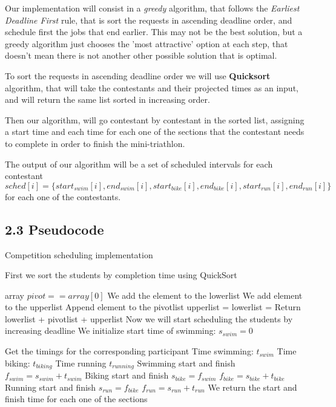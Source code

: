 \documentclass{article}
\begin{document}
Our implementation will consist in a \textit{greedy} algorithm, that follows the \textit{Earliest Deadline First} rule, that is sort the requests in ascending deadline order, and schedule first the jobs that end earlier. This may not be the best solution, but a greedy algorithm just chooses the 'most attractive' option at each step, that doesn't mean there is not another other possible solution that is optimal.

To sort the requests in ascending deadline order we will use \textbf{Quicksort} algorithm, that will take the contestants and their projected times as an input, and will return the same list sorted in increasing order.

Then our algorithm, will go contestant by contestant in the sorted list, assigning a start time and each time for each one of the sections that the contestant needs to complete in order to finish the mini-triathlon.

The output of our algorithm will be a set of scheduled intervals for each contestant $sched[i] = \{start_{swim}[i],end_{swim}[i],start_{bike}[i],end_{bike}[i],start_{run}[i],end_{run}[i]\}$
for each one of the contestants.

\subsection*{2.3 Pseudocode}

\begin{algorithm}[H]
\caption{Competition scheduling implementation}
\begin{algorithmic}[1]
\State First we sort the students by completion time using QuickSort

  \Return array
 \EndIf
  \State $pivot == array[0]$
    \State We add the element to the lowerlist
   \EndIf
    \State We add element to the upperlist
   \EndIf
    \State Append element to the pivotlist
   \EndIf
  \EndFor
  \State upperlist = 
  \State lowerlist = 
 \EndIf
 \State Return lowerlist + pivotlist + upperlist
\EndFunction
\State
\State Now we will start scheduling the students by increasing deadline
\State We initialize start time of swimming: $s_{swim} = 0$

 \State Get the timings for the corresponding participant
 \State Time swimming: $t_{swim}$
 \State Time biking: $t_{biking}$
 \State Time running $t_{running}$
 \State
 \State Swimming start and finish
 \State $f_{swim} = s_{swim} + t_{swim}$
 \State
 \State Biking start and finish
 \State $s_{bike} = f_{swim}$
 \State $f_{bike} = s_{bike} + t_{bike}$
 \State
 \State Running start and finish
 \State $s_{run} = f_{bike}$
 \State $f_{run} = s_{run} + t_{run}$
 \State
 \State We return the start and finish time for each one of the sections

\EndWhile
\end{algorithmic}
\end{algorithm}
\end{document}
